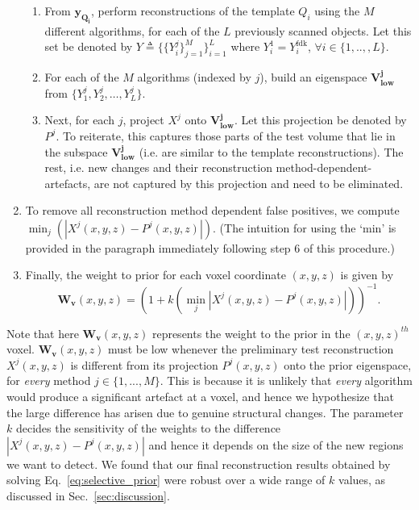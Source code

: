\documentclass[journal]{IEEEtran}
\begin{document}
\begin{enumerate}
\begin{enumerate}
  \item From $\boldsymbol{y_{Q_i}}$, perform reconstructions of the template $Q_i$ using the $M$ different algorithms, for each of the $L$ previously scanned objects. Let this set be denoted by $Y \triangleq \{\{Y_{i}^j\}_{j=1}^M\}_{i=1}^L$ where $Y^{1}_i = Y^{\text{fdk}}_i$, $\forall i \in \{1,..,,L\}$.


  \item For each of the $M$ algorithms (indexed by $j$), build an eigenspace $\boldsymbol{V_\text{low}^j}$ from $\{Y_1^j,Y_2^j, \ldots, Y_{L}^j\}$. %

  \item Next, for each $j$,  project $X^j$  onto $\boldsymbol{V_\text{low}^j}$. Let this projection be denoted by $P^j$. To reiterate, this captures those parts of the test volume that lie in the subspace $\boldsymbol{V_\text{low}^j}$ (i.e. are similar to the template reconstructions). The rest, i.e. new changes and their reconstruction method-dependent-artefacts, are not captured by this projection and need to be eliminated.
  \end{enumerate}
\item To remove all reconstruction method dependent false positives, we compute $\min_{j}(|X^j(x,y,z) - P^j(x,y,z)|)$. (The intuition for using the `min' is provided in the paragraph immediately following step 6 of this procedure.)
\item Finally, the weight to prior for each voxel coordinate $(x,y,z)$ is given by
  \begin{equation} 
    \boldsymbol{W_v}(x,y,z) = (1+k(\min_{j}|X^j(x,y,z) - P^j(x,y,z)|))^{-1}.
    \label{eq:weightsEq}
  \end{equation}
\end{enumerate}
\vspace{0.01mm}
Note that here $\boldsymbol{W_v}(x,y,z)$ represents the weight to the prior in the $(x,y,z)^{th}$ voxel. $\boldsymbol{W_v}(x,y,z)$ must be
low whenever the preliminary test reconstruction $X^j(x,y,z)$ is different from its projection $P^j(x,y,z)$ onto the prior eigenspace, for \emph{every} method $j \in \{1,...,M\}$. This is
because it is unlikely that \emph{every} algorithm would produce a significant artefact at a voxel, and hence we hypothesize that the large difference has arisen due to genuine structural changes. The parameter $k$ decides the sensitivity of the weights to the difference $|X^j(x,y,z) - P^j(x,y,z)|$ and hence it depends on the size of the new regions we want to detect.  
We found that our final reconstruction results obtained by
solving Eq.~\ref{eq:selective_prior} were robust over a wide range of $k$ values, as discussed in Sec.~\ref{sec:discussion}.
\end{document}
